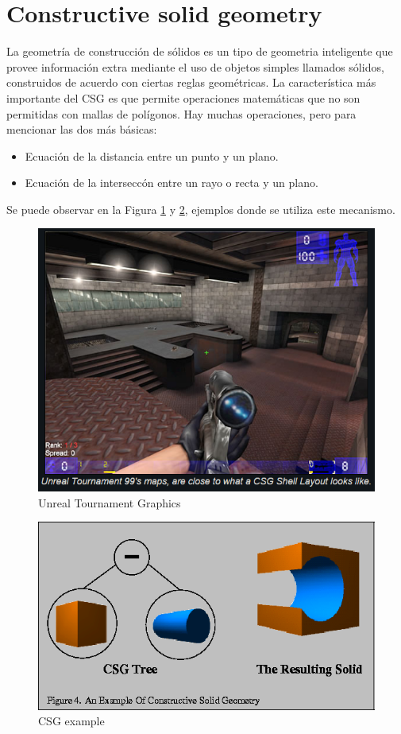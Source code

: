 \documentclass[11pt,letterpaper]{article}     %
\begin{document}
\section{Constructive solid geometry}\label{Apenx:CSG}
La geometr\' ia de construcci\' on de s\' olidos es un tipo de geometria inteligente que provee informaci\' on extra mediante el uso de objetos simples llamados s\' olidos, construidos de acuerdo con ciertas reglas geom\' etricas. \cite{CSG pdf}
La caracter\' istica m\' as importante del CSG es que permite operaciones matem\' aticas que no son permitidas con mallas de pol\' igonos.
Hay muchas operaciones, pero para mencionar las dos m\' as b\' asicas:
\begin{itemize}
\item Ecuaci\' on de la distancia entre un punto y un plano. 
\item Ecuaci\' on de la intersecc\' on entre un rayo o recta y un plano.
\end{itemize}
Se puede observar en la Figura \ref{fig:csg1} y \ref{fig:csg2}, ejemplos donde se utiliza este mecanismo.

\begin{figure}
	\centering
		\includegraphics[scale=0.6]{./imagenes/unrealCSG.png}
	\caption{Unreal Tournament Graphics}
	\label{fig:csg1}
\end{figure}

\begin{figure}
	\centering
		\includegraphics[scale=0.6]{./imagenes/csg.png}
	\caption{CSG example}
	\label{fig:csg2}
\end{figure}
\end{document}
